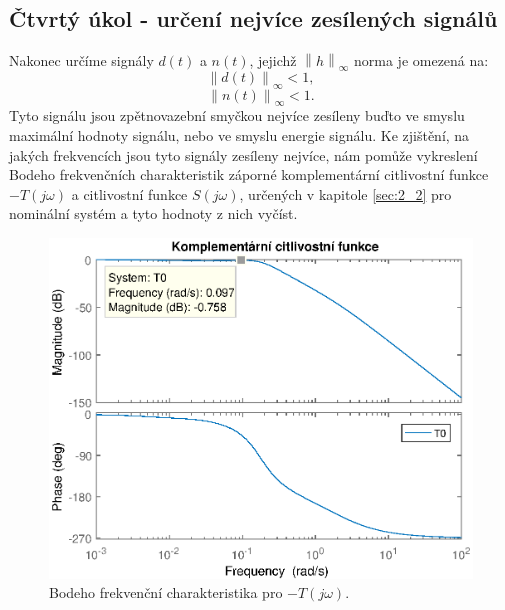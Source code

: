 \documentclass[a4paper,11pt]{article}
\begin{document}
\subsection{Čtvrtý úkol - určení nejvíce zesílených signálů}
Nakonec určíme signály $ d\left ( t \right ) $ a $ n\left ( t \right )  $, jejichž $ \left \| h \right \|_{\infty } $ norma je omezená na:
\begin{equation}
\left \| d\left ( t \right ) \right \|_{\infty }<1,
\end{equation}
\begin{equation}
\left \| n\left ( t \right ) \right \|_{\infty }<1.
\end{equation}
Tyto signálu jsou zpětnovazební smyčkou nejvíce zesíleny buďto ve smyslu maximální hodnoty signálu, nebo ve smyslu energie signálu. Ke zjištění, na jakých frekvencích jsou tyto signály zesíleny nejvíce, nám pomůže vykreslení Bodeho frekvenčních charakteristik záporné komplementární citlivostní funkce $ -T\left ( j\omega  \right ) $ a citlivostní funkce $ S\left ( j\omega  \right ) $, určených v kapitole \ref{sec:2_2} pro nominální systém a tyto hodnoty z nich vyčíst.
\begin{figure}[htbp]
	\begin{center}
	\includegraphics[scale = 1.0]{obrazky/komplementarniFunkceCtyrka.eps}
	\caption{Bodeho frekvenční charakteristika pro $ -T\left ( j\omega  \right ) $.}
	\label{fig:4_-T}
	\end{center}
\end{figure}
\end{document}
